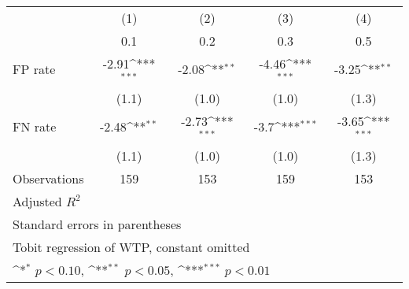 {
\def\sym#1{\ifmmode^{#1}\else\(^{#1}\)\fi}
\begin{tabular}{l*{4}{c}}
\hline\hline
                &\multicolumn{1}{c}{(1)}&\multicolumn{1}{c}{(2)}&\multicolumn{1}{c}{(3)}&\multicolumn{1}{c}{(4)}\\
                &\multicolumn{1}{c}{0.1}&\multicolumn{1}{c}{0.2}&\multicolumn{1}{c}{0.3}&\multicolumn{1}{c}{0.5}\\
\hline
FP rate         &    -2.91\sym{***}&    -2.08\sym{**} &    -4.46\sym{***}&    -3.25\sym{**} \\
                &    (1.1)         &    (1.0)         &    (1.0)         &    (1.3)         \\
FN rate         &    -2.48\sym{**} &    -2.73\sym{***}&     -3.7\sym{***}&    -3.65\sym{***}\\
                &    (1.1)         &    (1.0)         &    (1.0)         &    (1.3)         \\
\hline
Observations    &      159         &      153         &      159         &      153         \\
Adjusted \(R^{2}\)&                  &                  &                  &                  \\
\hline\hline
\multicolumn{5}{l}{\footnotesize Standard errors in parentheses}\\
\multicolumn{5}{l}{\footnotesize Tobit regression of WTP, constant omitted}\\
\multicolumn{5}{l}{\footnotesize \sym{*} \(p<0.10\), \sym{**} \(p<0.05\), \sym{***} \(p<0.01\)}\\
\end{tabular}
}
